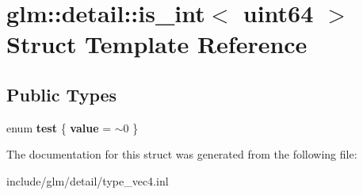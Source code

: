 \hypertarget{structglm_1_1detail_1_1is__int_3_01uint64_01_4}{}\section{glm\+:\+:detail\+:\+:is\+\_\+int$<$ uint64 $>$ Struct Template Reference}
\label{structglm_1_1detail_1_1is__int_3_01uint64_01_4}
\subsection*{Public Types}
\begin{DoxyCompactItemize}
\item 
\mbox{\label{structglm_1_1detail_1_1is__int_3_01uint64_01_4_a8be9e204582a6cf6049dac4a685cb868}} 
enum {\bfseries test} \{ {\bfseries value} = $\sim$0
 \}
\end{DoxyCompactItemize}


The documentation for this struct was generated from the following file\+:\begin{DoxyCompactItemize}
\item 
include/glm/detail/type\+\_\+vec4.\+inl\end{DoxyCompactItemize}
